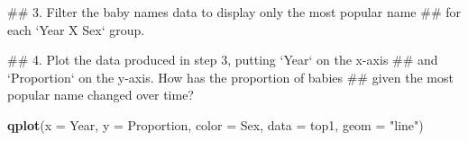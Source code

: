 \documentclass[]{book}
\newenvironment{Shaded}{\begin{snugshade}}{\end{snugshade}}
\newcommand{\KeywordTok}[1]{\textcolor[rgb]{0.13,0.29,0.53}{\textbf{#1}}}
\newcommand{\DataTypeTok}[1]{\textcolor[rgb]{0.13,0.29,0.53}{#1}}
\newcommand{\DecValTok}[1]{\textcolor[rgb]{0.00,0.00,0.81}{#1}}
\newcommand{\StringTok}[1]{\textcolor[rgb]{0.31,0.60,0.02}{#1}}
\newcommand{\OperatorTok}[1]{\textcolor[rgb]{0.81,0.36,0.00}{\textbf{#1}}}
\newcommand{\NormalTok}[1]{#1}
\begin{document}
\begin{Shaded}
\end{Shaded}

\begin{Shaded}
\begin{Highlighting}[]
\NormalTok{## 3.  Filter the baby names data to display only the most popular name }
\NormalTok{##     for each `Year X Sex` group.}
\end{Highlighting}
\end{Shaded}

\begin{Shaded}
\end{Shaded}

\begin{Shaded}
\begin{Highlighting}[]
\NormalTok{## 4. Plot the data produced in step 3, putting `Year` on the x-axis}
\NormalTok{##    and `Proportion` on the y-axis. How has the proportion of babies}
\NormalTok{##    given the most popular name changed over time?}
\end{Highlighting}
\end{Shaded}

\begin{Shaded}
\begin{Highlighting}[]
\KeywordTok{qplot}\NormalTok{(}\DataTypeTok{x =}\NormalTok{ Year, }
      \DataTypeTok{y =}\NormalTok{ Proportion, }
      \DataTypeTok{color =}\NormalTok{ Sex, }
      \DataTypeTok{data =}\NormalTok{ top1, }
      \DataTypeTok{geom =} \StringTok{"line"}\NormalTok{)}
\end{Highlighting}
\end{Shaded}
\end{document}
